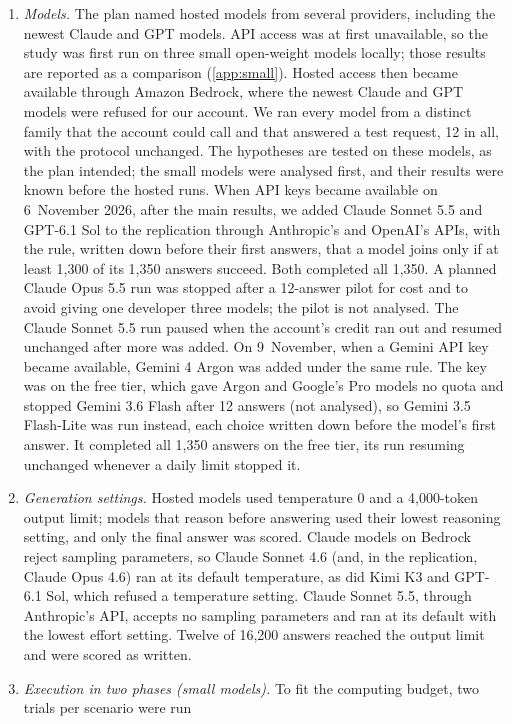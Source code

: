 \begin{enumerate}
  \item \emph{Models.} The plan named hosted models from several providers, including the newest Claude and GPT
  models. API access was at first unavailable, so the study was first run on three small open-weight models locally;
  those results are reported as a comparison (\cref{app:small}). Hosted access then became available through Amazon
  Bedrock, where the newest Claude and GPT models were refused for our account. We ran every model from a distinct
  family that the account could call and that answered a test request, 12 in all, with the protocol unchanged. The
  hypotheses are tested on these models, as the plan intended; the small models were analysed first, and their results
  were known before the hosted runs. When API keys became available on 6~November 2026, after the main results, we
  added Claude Sonnet 5.5 and GPT-6.1 Sol to the replication through Anthropic's and OpenAI's APIs, with the rule,
  written down before their first answers, that a model joins only if at least 1{,}300 of its 1{,}350 answers succeed.
  Both completed all 1{,}350. A planned Claude Opus 5.5 run was stopped after a 12-answer pilot for cost and to avoid
  giving one developer three models; the pilot is not analysed. The Claude Sonnet 5.5 run paused when the account's
  credit ran out and resumed unchanged after more was added. On 9~November, when a Gemini API key became available,
  Gemini 4 Argon was added under the same rule. The key was on the free tier, which gave Argon and Google's Pro models
  no quota and stopped Gemini 3.6 Flash after 12 answers (not analysed), so Gemini 3.5 Flash-Lite was run instead, each
  choice written down before the model's first answer. It completed all 1{,}350 answers on the free tier, its run
  resuming unchanged whenever a daily limit stopped it.
  \item \emph{Generation settings.} Hosted models used temperature 0 and a 4{,}000-token output limit; models that
  reason before answering used their lowest reasoning setting, and only the final answer was scored. Claude models on
  Bedrock reject sampling parameters, so Claude Sonnet 4.6 (and, in the replication, Claude Opus 4.6) ran at its
  default temperature, as did Kimi K3 and GPT-6.1 Sol, which refused a temperature setting. Claude Sonnet 5.5, through
  Anthropic's API, accepts no sampling parameters and ran at its default with the lowest effort setting. Twelve of 16{,}200 answers reached the
  output limit and were scored as written.
  \item \emph{Execution in two phases (small models).} To fit the computing budget, two trials per scenario were run

\end{enumerate}
